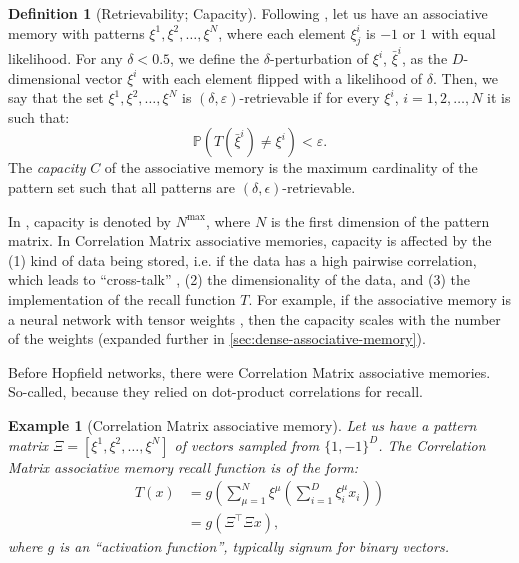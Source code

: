 \documentclass{article}
\newtheorem{example}{Example}[subsection]
\theoremstyle{definition}
\newtheorem{definition}{Definition}[subsection]
\begin{document}
\begin{definition}[Retrievability; Capacity]
  Following \textcite{bao_capacity_2022}, let us have an associative
  memory with patterns
  $\xi^1, \xi^2, \dots, \xi^N$, where each element $\xi^i_j$ is
  $-1$ or $1$ with equal likelihood. For any $\delta < 0.5$, we define
  the $\delta$-perturbation of $\xi^i$, $\bar \xi^i$, as
  the $D$-dimensional vector $\xi^i$ with each element flipped with a likelihood
  of $\delta$. Then, we say that the set $\xi^1, \xi^2, \dots, \xi^N$ is
  $(\delta, \varepsilon)$-retrievable if for every $\xi^i$, $i = 1, 2, \dots, N$
  it is such that:
  \begin{equation}
    \mathbb{P}(T(\bar \xi^i) \neq \xi^i) < \varepsilon.
  \end{equation}
  The \textit{capacity} $C$ of the associative memory is the maximum
  cardinality of the pattern set such that all patterns are $(\delta,
  \epsilon)$-retrievable.
\end{definition}

In \textcite{krotov_dense_2016}, capacity is denoted by $N^{\max}$, where
$N$ is the first dimension of the pattern matrix. In Correlation
Matrix associative
memories, capacity is affected by the (1) kind of data being stored,
i.e. if the data
has a high pairwise correlation, which leads to ``cross-talk''
\parencite{kohonen_correlation_1988},
(2) the dimensionality of the data, and (3) the implementation of the
recall function $T$.
For example, if the associative memory is a neural network with
tensor weights \parencite{kelly_memory_2017},
then the capacity scales with the number of the weights
\parencite{little_analytic_1978} (expanded
further in \autoref{sec:dense-associative-memory}).

Before Hopfield networks, there were Correlation Matrix associative memories.
So-called, because they relied on dot-product correlations for recall.
\begin{example}[Correlation Matrix associative memory]\label{example:correlation}
  Let us have a pattern matrix $\Xi = [\xi^1, \xi^2, \dots, \xi^N]$ of
  vectors sampled from $\{1, -1\}^D$. The Correlation Matrix associative memory
  recall function is of the form:
  \begin{align}
    T(x) &= g \left(\sum^N_{\mu=1} \xi^\mu \left( \sum^D_{i=1} \xi^\mu_i x_i \right)\right) \nonumber \\
      &= g \left( \Xi^\top \Xi x  \right),
  \end{align}
  where $g$ is an ``activation function'', typically \textit{signum} for binary vectors.
\end{example}
\end{document}
